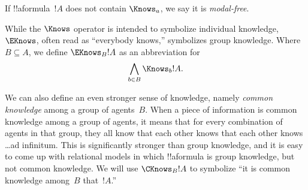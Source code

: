 \documentclass[../../../include/open-logic-section]{subfiles}
\begin{document}
If !!a{formula}~$!A$ does not contain $\Knows_a$, we say it
is \emph{modal-free}.

\begin{defn}
  While the $\Knows$ operator is intended to symbolize individual
  knowledge, $\EKnows$, often read as ``everybody knows,'' symbolizes
  group knowledge. Where $B \subseteq A$, we define $\EKnows_B !A$
 as an abbreviation for \[\bigwedge_{b \in B} \Knows_b !A.\]
\end{defn}

We can also define an even stronger sense of knowledge, namely
\emph{common knowledge} among a group of agents~$B$. When a piece of
information is common knowledge among a group of agents, it means that
for every combination of agents in that group, they all know that each
other knows that each other knows \dots ad infinitum. This is
significantly stronger than group knowledge, and it is easy to come up
with relational models in which !!a{formula} is group knowledge, but
not common knowledge. We will use $\CKnows_B !A$ to symbolize ``it is
common knowledge among~$B$ that~$!A$.''
\end{document}
